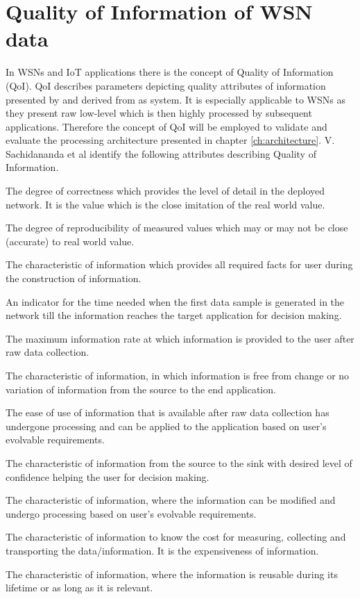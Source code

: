 \section{Quality of Information of WSN data}
\label{sec:back:qoi}
In WSNs and IoT applications there is the concept of Quality of Information (QoI). QoI describes parameters depicting quality attributes of information presented by and derived from as system. It is especially applicable to WSNs as they present raw low-level which is then highly processed by subsequent applications. Therefore the concept of QoI will be employed to validate and evaluate the processing architecture presented in chapter \ref{ch:architecture}. V. Sachidananda et al \cite{qoi_definition} identify the following attributes describing Quality of Information.
\begin{description}
\nospace
\item[Accuracy] The degree of correctness which provides the level of detail in the deployed network. It is the value which is the close imitation of the real world value.
\item[Precision] The degree of reproducibility of measured values which may or may not be close (accurate) to real world value.
\item[Completeness] The characteristic of information which provides all required facts for user during the construction of information.
\item[Timeliness] An indicator for the time needed when the first data sample is generated in the network till the information reaches the target application for decision making.
\item[Throughput] The maximum information rate at which information is provided to the user after raw data collection.
\item[Reliability] The characteristic of information, in which information is free from change or no variation of information from the source to the end application.
\item[Usability] The ease of use of information that is available after raw data collection has undergone processing and can be applied to the application based on user's evolvable requirements.
\item[Certainty] The characteristic of information from the source to the sink with desired level
of confidence helping the user for decision making.
\item[Tunability] The characteristic of information, where the information can be modified and undergo processing based on user's evolvable requirements.
\item[Affordability] The characteristic of information to know the cost for measuring, collecting and
transporting the data/information. It is the expensiveness of information. 
\item[Reusability] The characteristic of information, where the information is reusable during its lifetime or as long as it is relevant.
\end{description}
